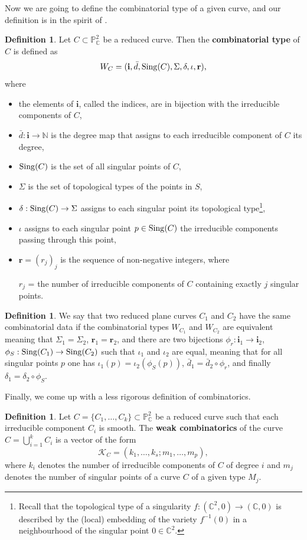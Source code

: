 \documentclass[11pt]{article}
\theoremstyle{plain}
\theoremstyle{definition}
\newtheorem{definition}[thm]{Definition}
\begin{document}
Now we are going to define the combinatorial type of a given curve, and our definition is in the spirit of \cite{cog}.
\begin{definition}
Let $C \subset \mathbb{P}^{2}_\mathbb{C}$ be a reduced curve. Then the \textbf{combinatorial type} of $C$ is defined as
$$W_{C} = (\textbf{i}, \bar{d}, {\rm Sing}(C), \Sigma, \delta, \iota, \textbf{r}),$$
where 
\begin{itemize}
\item the elements of $\textbf{i}$, called the indices, are in bijection with the irreducible components of $C$,
\item $\bar{d} : \textbf{i} \rightarrow \mathbb{N}$ is the degree map that assigns to each irreducible component of $C$ its degree,
\item ${\rm Sing}(C)$ is the set of all singular points of $C$,
\item $\Sigma$ is the set of topological types of the points in $S$,
\item $\delta : {\rm Sing}(C) \rightarrow \Sigma$ assigns to each singular point its topological type\footnote{Recall that the topological type of a singularity $f : (\mathbb{C}^{2}, 0) \to (\mathbb{C}, 0)$ is described by the
(local) embedding of the variety $f^{-1}(0)$ in a neighbourhood of the singular point $0 \in \mathbb{C}^{2}$.},
\item $\iota$ assigns to each singular point $p \in {\rm Sing}(C)$ the irreducible components passing through this point,
\item $\textbf{r} = (r_{j})_{j}$ is the sequence of non-negative integers, where

$r_{j}$ = the number of irreducible components of $C$ containing exactly $j$ singular points.
\end{itemize}
\end{definition}
\begin{definition}
We say that two reduced plane curves $C_{1}$ and $C_{2}$ have the same combinatorial data if the combinatorial types $W_{C_{1}}$ and $W_{C_{2}}$ are equivalent meaning that $\Sigma_{1} = \Sigma_{2}$, $\textbf{r}_{1} = \textbf{r}_{2}$, and there are two bijections $\phi_{r} : \textbf{i}_{1} \rightarrow \textbf{i}_{2}$, $\phi_{S} : {\rm Sing}(C_{1}) \rightarrow {\rm Sing}(C_{2})$ such that $\iota_{1}$ and $\iota_{2}$ are equal, meaning that for all singular points $p$ one has $\iota_{1}(p) = \iota_{2}(\phi_{S}(p))$, $\bar{d}_{1} = \bar{d}_{2} \circ \phi_{r}$, and finally $\delta_{1} = \delta_{2} \circ \phi_{S}$.
\end{definition}
Finally, we come up with a less rigorous definition of combinatorics.
\begin{definition}
Let $C = \{C_{1}, \ldots, C_{k}\} \subset \mathbb{P}^{2}_{\mathbb{C}}$ be a reduced curve such that each irreducible component $C_{i}$ is smooth. The \textbf{weak combinatorics} of the curve $C = \bigcup_{i=1}^{k}C_{i}$ is a vector of the form 
$$\mathcal{K}_{C} = (k_{1}, \ldots, k_{s}; m_{1}, \ldots, m_{p}),$$ where $k_{i}$ denotes the number of irreducible components of $C$ of degree $i$ and $m_{j}$ denotes the number of singular points of a curve $C$ of a given type $M_{j}$.
\end{definition}
\end{document}
